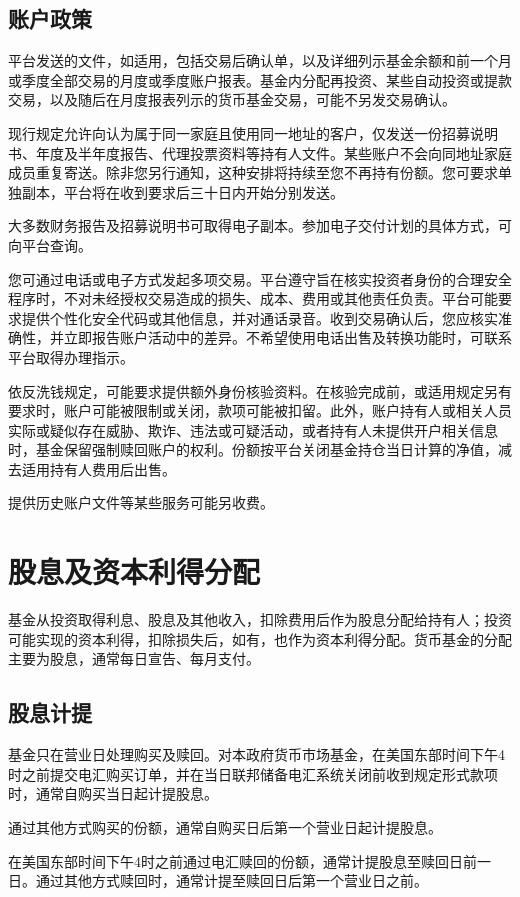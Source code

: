 \documentclass[UTF8,fontset=none,11pt,a4paper]{ctexart}
\begin{document}
\subsection*{账户政策}
平台发送的文件，如适用，包括交易后确认单，以及详细列示基金余额和前一个月或季度全部交易的月度或季度账户报表。基金内分配再投资、某些自动投资或提款交易，以及随后在月度报表列示的货币基金交易，可能不另发交易确认。


现行规定允许向认为属于同一家庭且使用同一地址的客户，仅发送一份招募说明书、年度及半年度报告、代理投票资料等持有人文件。某些账户不会向同地址家庭成员重复寄送。除非您另行通知，这种安排将持续至您不再持有份额。您可要求单独副本，平台将在收到要求后三十日内开始分别发送。


大多数财务报告及招募说明书可取得电子副本。参加电子交付计划的具体方式，可向平台查询。


您可通过电话或电子方式发起多项交易。平台遵守旨在核实投资者身份的合理安全程序时，不对未经授权交易造成的损失、成本、费用或其他责任负责。平台可能要求提供个性化安全代码或其他信息，并对通话录音。收到交易确认后，您应核实准确性，并立即报告账户活动中的差异。不希望使用电话出售及转换功能时，可联系平台取得办理指示。


依反洗钱规定，可能要求提供额外身份核验资料。在核验完成前，或适用规定另有要求时，账户可能被限制或关闭，款项可能被扣留。此外，账户持有人或相关人员实际或疑似存在威胁、欺诈、违法或可疑活动，或者持有人未提供开户相关信息时，基金保留强制赎回账户的权利。份额按平台关闭基金持仓当日计算的净值，减去适用持有人费用后出售。


提供历史账户文件等某些服务可能另收费。


\section*{股息及资本利得分配}
基金从投资取得利息、股息及其他收入，扣除费用后作为股息分配给持有人；投资可能实现的资本利得，扣除损失后，如有，也作为资本利得分配。货币基金的分配主要为股息，通常每日宣告、每月支付。


\subsection*{股息计提}
基金只在营业日处理购买及赎回。对本政府货币市场基金，在美国东部时间下午4时之前提交电汇购买订单，并在当日联邦储备电汇系统关闭前收到规定形式款项时，通常自购买当日起计提股息。


通过其他方式购买的份额，通常自购买日后第一个营业日起计提股息。


在美国东部时间下午4时之前通过电汇赎回的份额，通常计提股息至赎回日前一日。通过其他方式赎回时，通常计提至赎回日后第一个营业日之前。
\end{document}
